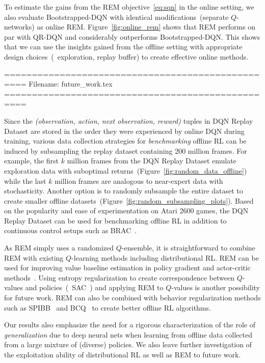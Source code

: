 To estimate the gains from the REM objective~\eqref{eq:sqn} in the online
setting, we also evaluate Bootstrapped-DQN with identical
modifications~(\eg separate $Q$-networks) as online
REM. Figure~\ref{fig:online_rem} %
shows that REM performs on par with
QR-DQN and considerably outperforms Bootstrapped-DQN.
This shows that we can use the insights gained from the offline setting with appropriate
design choices~(\eg~exploration, replay buffer) to create effective online methods.








==================================================
Filename: future_work.tex
==================================================

Since the \textit{(observation, action, next observation, reward)} tuples in DQN Replay Dataset are stored in the order they were experienced by online DQN during training, various data collection strategies for \textit{benchmarking} offline RL can be induced by subsampling the
replay dataset containing 200 million frames. For example, the first $k$ million frames from the DQN Replay Dataset emulate exploration data with suboptimal returns~(\eg Figure~\ref{fig:random_data_offline}) while the last $k$ million frames are analogous to near-expert data with stochasticity. Another option is to randomly subsample the entire dataset to create smaller offline datasets~(\eg Figure~\ref{fig:random_subsampling_plots}).
Based on the popularity and ease of experimentation on Atari 2600 games, the DQN Replay Dataset can be used for benchmarking offline RL in addition to continuous control setups such as BRAC~\citep{wu2019behavior}.

As REM simply uses a randomized $Q$-ensemble, it is straightforward to combine REM with existing $Q$-learning methods including distributional RL. REM can be used for improving value baseline estimation in policy gradient and actor-critic methods~\citep{weng2018PG}.
Using entropy regularization to create correspondence between $Q$-values and policies~(\eg\ SAC~\citep{haarnoja2018soft}) and applying REM to $Q$-values is another possibility for future work. REM can also be combined with behavior regularization methods
such as SPIBB~\citep{laroche2017safe} and BCQ~\citep{fujimoto2018off} to create better offline RL algorithms.

Our results also emphasize the need for a rigorous characterization of the role of  \textit{generalization} due to deep neural nets when learning from offline data collected from a large mixture of (diverse) policies. We also leave further investigation of the exploitation ability of distributional RL as well as REM to future work. 

